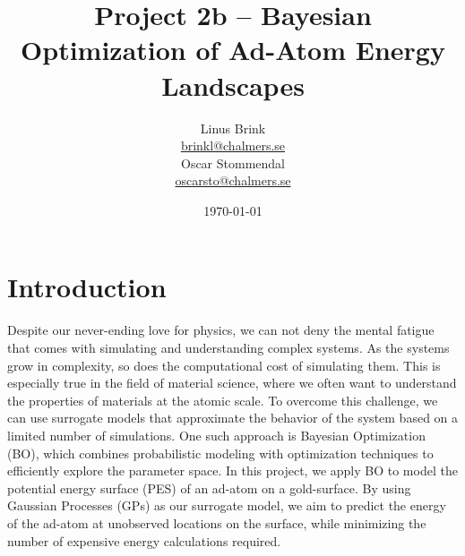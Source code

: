 \documentclass[a4paper, 12pt]{article}
\begin{document}
\lstset{language=Python}
\title{
\sffamily
\vspace{-1.7cm}
{\huge\textbf{Project 2b -- Bayesian Optimization of Ad-Atom Energy Landscapes}} \\[-0.4cm]
}
\author{
    \vspace{-0.4cm}
    \begin{minipage}[t]{0.45\textwidth}
\centering
Linus Brink\\
\href{mailto:brinkl@chalmers.se}{brinkl@chalmers.se}
\end{minipage}%
\hfill
\begin{minipage}[t]{0.45\textwidth}
\centering
Oscar Stommendal\\
\href{mailto:oscarsto@chalmers.se}{oscarsto@chalmers.se}
\vspace{0.5cm}
\end{minipage}
}
\date{\today}
\maketitle
\vspace{-1.5cm}
\section{Introduction}
Despite our never-ending love for physics, we can not deny the mental fatigue that comes with simulating and understanding complex systems. As the systems grow in complexity, so does the computational cost of simulating them. This is especially true in the field of material science, where we often want to understand the properties of materials at the atomic scale. To overcome this challenge, we can use surrogate models that approximate the behavior of the system based on a limited number of simulations. One such approach is Bayesian Optimization (BO), which combines probabilistic modeling with optimization techniques to efficiently explore the parameter space. In this project, we apply BO to model the potential energy surface (PES) of an ad-atom on a gold-surface. By using Gaussian Processes (GPs) as our surrogate model, we aim to predict the energy of the ad-atom at unobserved locations on the surface, while minimizing the number of expensive energy calculations required.
\end{document}

